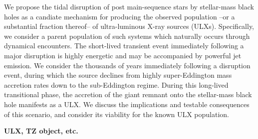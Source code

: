 
We propose the tidal disruption of post main-sequence stars by stellar-mass black holes as a candiate mechanism for
producing the observed population --or a substantial fraction thereof-- of ultra-luminous X-ray sources (ULXs).   Specifically, we consider a parent population of such systems which naturally occurs through dynamical encounters.  The short-lived transient event immediately following a major disruption is highly energetic and may be 
accompanied by powerful jet emission.  We consider the thousands of years immediately following a disruption event, during which the source declines from highly super-Eddington mass accretion rates down to the sub-Eddington regime.  During this long-lived transitional phase, the accretion of the giant remnant onto the stellar-mass black hole manifests as a ULX.   We discuss the implications and testable consequences of this scenario, and consider its viability for the known ULX population.


{\bf ULX, TZ object, etc.}

